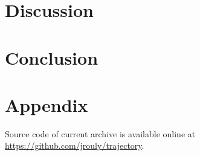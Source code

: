 \documentclass[paper=a4, fontsize=11pt]{scrartcl} %
\numberwithin{equation}{section} %
\numberwithin{figure}{section} %
\numberwithin{table}{section} %
\begin{document}

\section{Discussion}





\section{Conclusion}





\clearpage






\appendix
\section{Appendix}


Source code of current archive is available online at
\href{https://github.com/jrouly/trajectory.git}{https://github.com/jrouly/trajectory}.

\end{document}
